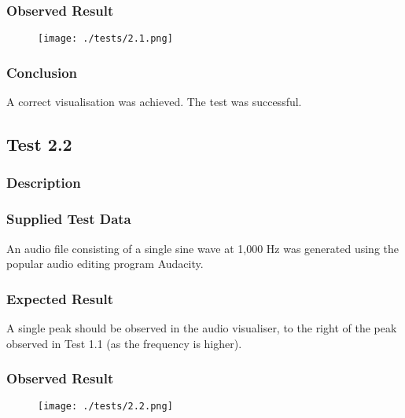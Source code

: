 \subsubsection*{Observed Result}
\label{sec:evidence2.1}
\begin{figure}[H]
	\texttt{[image: ./tests/2.1.png]}
\end{figure}

\subsubsection*{Conclusion}
A correct visualisation was achieved. The test was successful.

\pagebreak
\subsection{Test 2.2}
\subsubsection*{Description}
\paragraph{}
{
	\centering
}

\subsubsection*{Supplied Test Data}
An audio file consisting of a single sine wave at 1,000 Hz was generated using the popular audio editing program Audacity.

\subsubsection*{Expected Result}
A single peak should be observed in the audio visualiser, to the right of the peak observed in Test 1.1 (as the frequency is higher).

\subsubsection*{Observed Result}
\label{sec:evidence2.2}
\begin{figure}[H]
	\texttt{[image: ./tests/2.2.png]}
\end{figure}

